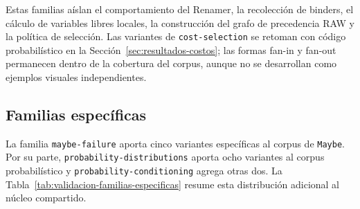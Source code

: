\begin{table}[ht]
\centering
\TableSetup
{}
\caption{Familias y variantes compartidas por los dos corpus.}
\label{tab:validacion-familias-compartidas}
\end{table}

Estas familias aíslan el comportamiento del Renamer, la recolección de binders, el cálculo de variables libres locales, la construcción del grafo de precedencia RAW y la política de selección. Las variantes de \texttt{cost-selection} se retoman con código probabilístico en la Sección~\ref{sec:resultados-costos}; las formas fan-in y fan-out permanecen dentro de la cobertura del corpus, aunque no se desarrollan como ejemplos visuales independientes.

\subsection{Familias específicas}

La familia \texttt{maybe-failure} aporta cinco variantes específicas al corpus de \texttt{Maybe}. Por su parte, \texttt{probability-distributions} aporta ocho variantes al corpus probabilístico y \texttt{probability-conditioning} agrega otras dos. La Tabla~\ref{tab:validacion-familias-especificas} resume esta distribución adicional al núcleo compartido.

